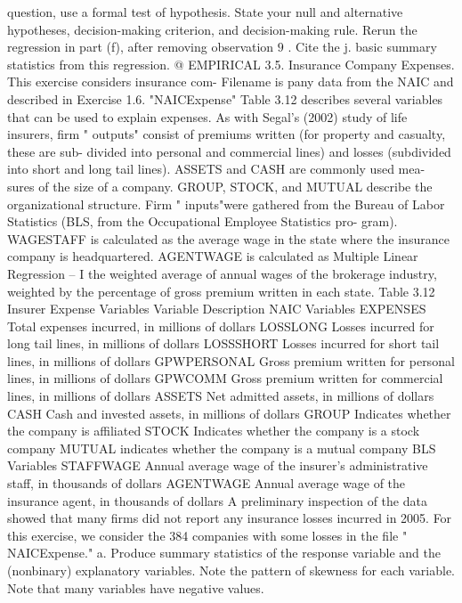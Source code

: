 \documentclass[11pt]{article}
\begin{document}
 question, use a formal test of hypothesis. State your null and alternative
hypotheses, decision-making criterion, and decision-making rule.
 Rerun the regression in part (f), after removing observation \(9\) . Cite the
j.
 basic summary statistics from this regression. @ EMPIRICAL
3.5. Insurance Company Expenses. This exercise considers insurance com- Filename is
 pany data from the NAIC and described in Exercise 1.6. "NAICExpense"
Table 3.12 describes several variables that can be used to explain
expenses. As with Segal's (2002) study of life insurers, firm " outputs"
consist of premiums written (for property and casualty, these are sub-
divided into personal and commercial lines) and losses (subdivided into
short and long tail lines). ASSETS and CASH are commonly used mea-
sures of the size of a company. GROUP, STOCK, and MUTUAL describe
 the organizational structure. Firm " inputs"were gathered from the Bureau
 of Labor Statistics (BLS, from the Occupational Employee Statistics pro-
 gram). WAGESTAFF is calculated as the average wage in the state where
the insurance company is headquartered. AGENTWAGE is calculated as
 Multiple Linear Regression -- I
 the weighted average of annual wages of the brokerage industry, weighted
 by the percentage of gross premium written in each state.
Table 3.12 Insurer
 Expense Variables Variable Description
 NAIC Variables
EXPENSES Total expenses incurred, in millions of dollars
LOSSLONG Losses incurred for long tail lines, in millions of dollars
LOSSSHORT Losses incurred for short tail lines, in millions of dollars
GPWPERSONAL Gross premium written for personal lines, in millions of dollars
GPWCOMM Gross premium written for commercial lines, in millions of dollars
ASSETS Net admitted assets, in millions of dollars
CASH Cash and invested assets, in millions of dollars
GROUP Indicates whether the company is affiliated
 STOCK Indicates whether the company is a stock company
 MUTUAL indicates whether the company is a mutual company
 BLS Variables
STAFFWAGE Annual average wage of the insurer's administrative staff,
 in thousands of dollars
AGENTWAGE Annual average wage of the insurance agent, in thousands of dollars
 A preliminary inspection of the data showed that many firms did not
report any insurance losses incurred in 2005. For this exercise, we consider
the 384 companies with some losses in the file " NAICExpense."
 a. Produce summary statistics of the response variable and the (nonbinary)
 explanatory variables. Note the pattern of skewness for each variable.
 Note that many variables have negative values.
\end{document}
